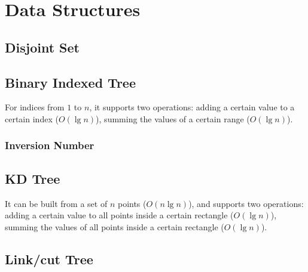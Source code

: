 \section{Data Structures} %

\subsection{Disjoint Set} %


\subsection{Binary Indexed Tree} %

For indices from $1$ to $n$, it supports two operations: adding a certain value to a certain index ($O(\lg{n})$), summing the values of a certain range ($O(\lg{n})$).


\subsubsection{Inversion Number} %



\subsection{KD Tree} %
It can be built from a set of $n$ points ($O(n\lg{n})$), and supports two operations: adding a certain value to all points inside a certain rectangle ($O(\lg{n})$), summing the values of all points inside a certain rectangle ($O(\lg{n})$).


\subsection{Link/cut Tree} %


